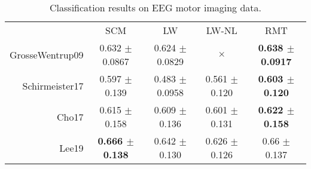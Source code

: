 \documentclass{article}
\theoremstyle{plain}
\theoremstyle{definition}
\theoremstyle{remark}
\begin{document}
\begin{table*}[t]
    \centering
    \begin{tabular}{rcccc}
        & SCM & LW & LW-NL & RMT \\
        \cline{2-5}
        GrosseWentrup09 & 0.632 $\pm$ 0.0867& 0.624 $\pm$ 0.0829 & $\times$ & {\bf 0.638 $\pm$ 0.0917} \\
        Schirmeister17 & 0.597 $\pm$  0.139 & 0.483 $\pm$ 0.0958 & 0.561 $\pm$ 0.120 & {\bf 0.603 $\pm$ 0.120} \\
        Cho17 & 0.615 $\pm$ 0.158 & 0.609 $\pm$ 0.136 & 0.601 $\pm$ 0.131 & {\bf 0.622 $\pm$ 0.158} \\
        Lee19 & {\bf 0.666 $\pm$ 0.138} & 0.642 $\pm$ 0.130 & 0.626 $\pm$ 0.126 & 0.66 $\pm$ 0.137\\
    \end{tabular}
    \caption{Classification results on EEG motor imaging data.}
    \label{tab:eeg_mi}
\end{table*}
\end{document}
